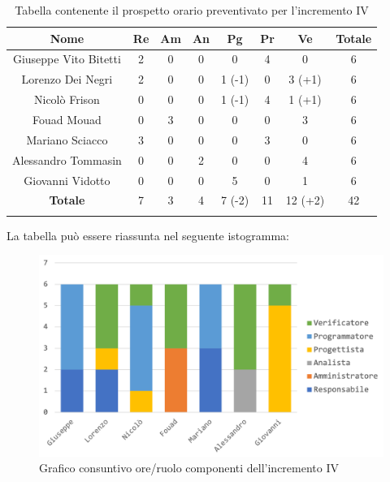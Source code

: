 			\begin{longtable}{|c|c|c|c|c|c|c|c}
				\hline
				\rowcolor{lighter-grayer}
				\textbf{Nome} & \textbf{Re} & \textbf{Am} & \textbf{An} & \textbf{Pg}  & \textbf{Pr}   & \textbf{Ve} & \textbf{Totale} \\
				\hline
				\endfirsthead
				\hline
				Giuseppe Vito Bitetti & 2 & 0 & 0 & 0 & 4 & 0 & 6\\
				\hline
				\hline
				Lorenzo Dei Negri & 2 & 0 & 0 & 1 (-1) & 0 & 3 (+1) & 6\\
				\hline
				\hline
				Nicolò Frison & 0 & 0 & 0 & 1 (-1) & 4 & 1 (+1) & 6\\
				\hline
				\hline
				Fouad Mouad & 0 & 3 & 0 & 0 & 0 & 3 & 6\\
				\hline
				\hline
				Mariano Sciacco & 3 & 0 & 0 & 0 & 3 & 0 & 6\\
				\hline
				\hline
				Alessandro Tommasin & 0 & 0 & 2 & 0 & 0 & 4 & 6\\
				\hline
				\hline
				Giovanni Vidotto & 0 & 0 & 0 & 5 & 0 & 1 & 6\\
				\hline 
				\textbf{Totale} & 7 &  3 & 4 & 7 (-2) & 11  & 12 (+2) & 42 \\
				\hline 
				
				\caption{Tabella contenente il prospetto orario preventivato per l'incremento IV}
			\end{longtable}
			
			La tabella può essere riassunta nel seguente istogramma:
			
			\begin{figure}[H]
				\centering
				\includegraphics[width=0.8\linewidth]{images/consuntivo/ConsIncr4-1.png}
				\caption{Grafico consuntivo ore/ruolo componenti dell'incremento IV}
				\label{fig:consuntivo grafico suddivisione ruoli incremento IV}
			\end{figure}
			\pagebreak
			
